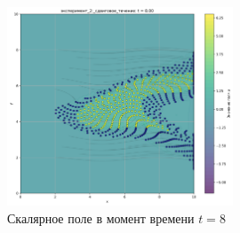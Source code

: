 \begin{figure}[h]
	\centering
	\includegraphics[width=0.6\textwidth]{imgs/lg/эксперимент_2:_сдвиговое_течение_t8.00.png}
	\caption{Скалярное поле в момент времени $t=8$ }
\end{figure}
